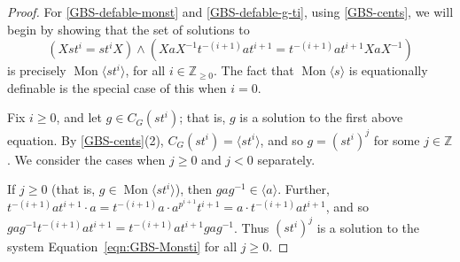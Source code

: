 \documentclass[10pt,a4paper]{amsart}
\DeclareMathOperator{\Mon}{Mon}
\newcommand{\Z}{\mathbb{Z}}
\begin{document}
	\begin{proof}
			For \eqref{GBS-defable-monst} and \eqref{GBS-defable-g-ti}, using \cref{GBS-cents}, we will begin by showing
			that the set of solutions to
			\begin{equation}
					\label{eqn:GBS-Monsti}
					(X st^i = st^i X) \wedge (XaX^{-1} t^{-(i + 1)} at^{i + 1} = t^{-(i + 1)}
			at^{i + 1} XaX^{-1})
			\end{equation}
			is precisely \(\Mon\langle st^i \rangle\), for all \(i \in \Z_{\geq
			0}\). The fact that \(\Mon \langle s \rangle\) is equationally
			definable is the special case of this when \(i = 0\).

			Fix \(i \geq 0\), and let \(g \in 
			 C_G(st^i)\); that is, \(g\) is a solution to the first above equation.
			 By \cref{GBS-cents}(2), \(C_G(st^i) = \langle st^i \rangle\), and so
			 \(g = (st^i)^j\) for some \(j \in \Z\). We consider the cases when
			 \(j \geq 0\) and \(j < 0\) separately.

			 If \(j \geq 0\) (that is, \(g \in \Mon\langle st^i \rangle\)),
			 then \(gag^{-1} \in \langle a \rangle\). Further, \(t^{-(i + 1)} a
			 t^{i + 1} \cdot a = t^{-(i + 1)} a \cdot a^{p^{i + 1}} t^{i + 1} =
			 a \cdot t^{-(i + 1)} at^{i + 1}\), and so \(gag^{-1} t^{-(i + 1)}
			 a t^{i + 1} = t^{-(i + 1)} a t^{i + 1} gag^{-1}\). Thus
			 \((st^i)^j\) is a solution to the system Equation~\eqref{eqn:GBS-Monsti}
			 for all \(j \geq 0\).


\end{proof}
\end{document}
